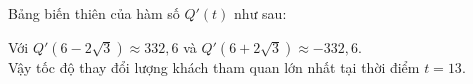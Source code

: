 \begin{ex}
{\begin{enumerate}[a)]
			Bảng biến thiên của hàm số ${Q}'\left( t \right)$ như sau:
			\begin{center}
			\end{center}
			Với ${Q}'\left( 6-2\sqrt{3} \right)\approx 332,6$ và ${Q}'\left( 6+2\sqrt{3} \right)\approx -332{,}6$.\\
			Vậy tốc độ thay đổi lượng khách tham quan lớn nhất tại thời điểm $t=13$.
		\end{enumerate}
	}
\end{ex}


